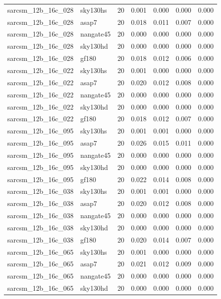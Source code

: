 \begin{tabular}{llrrrrr}
sarcsm\_12b\_16c\_028 & sky130hs & 20 & 0.001 & 0.000 & 0.000 & 0.000 \\
sarcsm\_12b\_16c\_028 & asap7 & 20 & 0.018 & 0.011 & 0.007 & 0.000 \\
sarcsm\_12b\_16c\_028 & nangate45 & 20 & 0.000 & 0.000 & 0.000 & 0.000 \\
sarcsm\_12b\_16c\_028 & sky130hd & 20 & 0.000 & 0.000 & 0.000 & 0.000 \\
sarcsm\_12b\_16c\_028 & gf180 & 20 & 0.018 & 0.012 & 0.006 & 0.000 \\
sarcsm\_12b\_16c\_022 & sky130hs & 20 & 0.001 & 0.000 & 0.000 & 0.000 \\
sarcsm\_12b\_16c\_022 & asap7 & 20 & 0.020 & 0.012 & 0.008 & 0.000 \\
sarcsm\_12b\_16c\_022 & nangate45 & 20 & 0.000 & 0.000 & 0.000 & 0.000 \\
sarcsm\_12b\_16c\_022 & sky130hd & 20 & 0.000 & 0.000 & 0.000 & 0.000 \\
sarcsm\_12b\_16c\_022 & gf180 & 20 & 0.018 & 0.012 & 0.007 & 0.000 \\
sarcsm\_12b\_16c\_095 & sky130hs & 20 & 0.001 & 0.001 & 0.000 & 0.000 \\
sarcsm\_12b\_16c\_095 & asap7 & 20 & 0.026 & 0.015 & 0.011 & 0.000 \\
sarcsm\_12b\_16c\_095 & nangate45 & 20 & 0.000 & 0.000 & 0.000 & 0.000 \\
sarcsm\_12b\_16c\_095 & sky130hd & 20 & 0.000 & 0.000 & 0.000 & 0.000 \\
sarcsm\_12b\_16c\_095 & gf180 & 20 & 0.022 & 0.014 & 0.008 & 0.000 \\
sarcsm\_12b\_16c\_038 & sky130hs & 20 & 0.001 & 0.001 & 0.000 & 0.000 \\
sarcsm\_12b\_16c\_038 & asap7 & 20 & 0.020 & 0.012 & 0.008 & 0.000 \\
sarcsm\_12b\_16c\_038 & nangate45 & 20 & 0.000 & 0.000 & 0.000 & 0.000 \\
sarcsm\_12b\_16c\_038 & sky130hd & 20 & 0.000 & 0.000 & 0.000 & 0.000 \\
sarcsm\_12b\_16c\_038 & gf180 & 20 & 0.020 & 0.014 & 0.007 & 0.000 \\
sarcsm\_12b\_16c\_065 & sky130hs & 20 & 0.001 & 0.000 & 0.000 & 0.000 \\
sarcsm\_12b\_16c\_065 & asap7 & 20 & 0.021 & 0.012 & 0.009 & 0.000 \\
sarcsm\_12b\_16c\_065 & nangate45 & 20 & 0.000 & 0.000 & 0.000 & 0.000 \\
sarcsm\_12b\_16c\_065 & sky130hd & 20 & 0.000 & 0.000 & 0.000 & 0.000 \\

\end{tabular}
